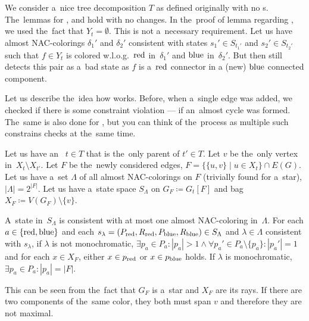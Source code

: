 We consider a~nice tree decomposition \( T \) as defined originally
with no \IntroduceEdgeNode{}s.
The~lemmas for
\LeafNode{}, \RootNode{} and \ForgetVertexNode{} hold with no changes.
%
In the~proof of lemma 
regarding \JoinNode{},
we used the~fact that \( Y_t = \emptyset \).
This is not a~necessary requirement.
%
Let us have almost NAC-colorings \( \delta_1' \) and \( \delta_2' \)
consistent with states \( s_1' \in S_{t_1'} \) and \( s_2' \in S_{t_2'} \)
such that \( f \in Y_t \) is colored w.l.o.g.\ \( \text{red} \) in~\( \delta_1' \)
and \( \text{blue} \) in~\( \delta_2' \).
But then 
still detects this pair as a~bad state
as \( f \) is a~\( \text{red} \) connector in a (new) \( \text{blue} \) connected component.

Let us describe the~idea how \IntroduceVertexWithEdgesNode{} works.
Before, when a~single edge was added,
we checked if there is some constraint violation
--- if an~almost cycle was formed.
The~same is also done for \IntroduceVertexWithEdgesNode{},
but you can think of the~process as
multiple such constrains checks at the~same time.

Let us have an~\IntroduceVertexWithEdgesNode{} \( t \in T \) that
is the~only parent of \( t' \in T \).
Let \( v \) be the~only vertex in~\( X_t \setminus X_{t'} \).
Let \( F \) be the~newly considered edges,
\( F = \{ \{ u, v \} \mid u \in X_t \} \cap E(G) \).
%
Let us have a~set \( \Lambda \) of all almost NAC-colorings on \( F \)
(trivially found for a~star), \( |\Lambda| = 2^{|F|} \).
Let us have a~state space \( S_\Lambda \) on \( G_F \coloneqq G_t[F] \)
and bag \( X_F \coloneqq V(G_F) \setminus \{ v \} \).
%
\begin{observation}
	A~state in~\( S_\Lambda \) is consistent with at most one
	almost NAC-coloring in~\( \Lambda \).
	For each \( a \in \{\text{red}, \text{blue}\} \) and
	each \( s_\lambda = (P_{\text{red}}, R_{\text{red}}, P_{\text{blue}}, R_{\text{blue}}) \in S_\Lambda \)
	and \( \lambda \in \Lambda \) consistent with \( s_\lambda \),
	if \( \lambda \) is not monochromatic,
	\( \exists p_a \in P_a : |p_a| > 1
	\land \forall p_a' \in P_a \setminus \{p_a\} : |p_a'| = 1 \)
	and for each \( x \in X_F \), either \( x \in p_{\text{red}} \) or \( x \in p_{\text{blue}} \) holds.
	If \( \lambda \) is monochromatic, \( \exists p_a \in P_a : |p_a| = |F| \).
\end{observation}
%
This can be seen from the~fact that \( G_F \) is a~star and \( X_F \) are its rays.
If there are two components of the~same color,
they both must span \( v \)
and therefore they are not maximal.

